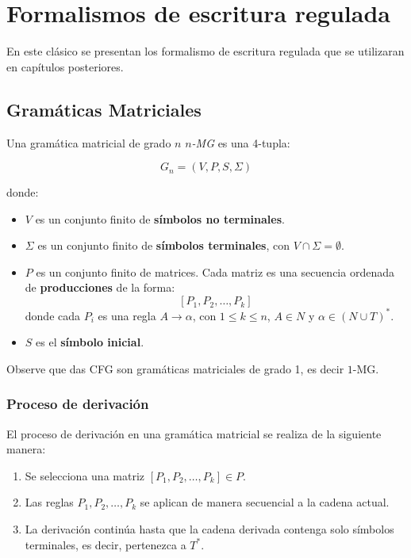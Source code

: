\chapter{Formalismos de escritura regulada}

En este clásico se presentan los formalismo de escritura regulada que se utilizaran en capítulos posteriores.

\section{Gramáticas Matriciales}

Una gramática matricial \cite{simpleMatrixLanguages} de grado $n$ \textit{$n$-MG} es una 4-tupla:

\[
    G_n = (V, P, S,\Sigma)
\]

donde:
\begin{itemize}
    \item \( V \) es un conjunto finito de \textbf{símbolos no terminales}.
    \item \( \Sigma \) es un conjunto finito de \textbf{símbolos terminales}, con \( V \cap \Sigma = \emptyset \).
    \item \( P \) es un conjunto finito de matrices. Cada matriz es una secuencia ordenada de \textbf{producciones} de la forma:
          \[
              [P_1, P_2, \dots, P_k]
          \]
          donde cada \( P_i \) es una regla \( A \to \alpha \), con $1\leq k\leq n$, \( A \in N \) y \( \alpha \in (N \cup T)^* \).
    \item \( S  \) es el \textbf{símbolo inicial}.
\end{itemize}

Observe que das CFG son gramáticas matriciales de grado 1, es decir $1$-MG.

\subsection{Proceso de derivación}

El proceso de derivación en una gramática matricial se realiza de la siguiente manera:
\begin{enumerate}
    \item Se selecciona una matriz \( [P_1, P_2, \dots, P_k] \in P \).
    \item Las reglas \( P_1, P_2, \dots, P_k \) se aplican de manera secuencial a la cadena actual.
    \item La derivación continúa hasta que la cadena derivada contenga solo símbolos terminales, es decir, pertenezca a \( T^* \).
\end{enumerate}

